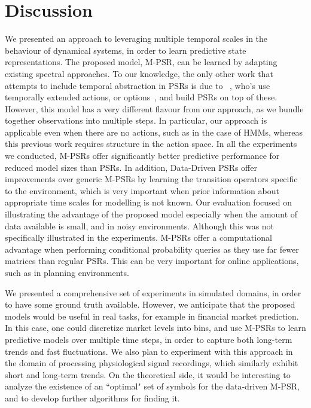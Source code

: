 \section{Discussion}

We presented an approach to leveraging multiple temporal scales in the behaviour of dynamical systems, in order to learn predictive state representations.  The proposed model, M-PSR, can be learned by adapting existing spectral approaches.  To our knowledge, the only other work that attempts to include temporal abstraction in PSRs is due to ~\cite{wolfe06}, who's use temporally extended actions, or options~\cite{sutton99}, and build PSRs on top of these.  However, this model has a very different flavour from our approach, as we bundle together observations into multiple steps.  In particular, our approach is applicable even when there are no actions, such as in the case of HMMs, whereas this previous work requires structure in the action space.
In all the experiments we conducted, M-PSRs offer significantly better predictive performance for reduced model sizes than PSRs. In addition, Data-Driven PSRs offer improvements over generic M-PSRs by learning the transition operators specific to the environment, which is very important when prior information about appropriate time scales for modelling is not known.  Our evaluation focused on illustrating the advantage of the proposed model especially when the amount of data available is small, and in noisy environments.
 Although this was not specifically illustrated in the experiments. M-PSRs offer a computational advantage when performing conditional probability queries as they use far fewer matrices than regular PSRs. This can be very important for online applications, such as in planning environments. 
 
 We presented a comprehensive set of experiments in simulated domains, in order to have some ground truth available.  However, we anticipate that the proposed models would be useful in real tasks, for example in financial market prediction.  In this case, one could discretize market levels into bins, and use M-PSRs to learn predictive models over multiple time steps, in order to capture both long-term trends and fast fluctuations.  We also plan to experiment with this approach in the domain of processing physiological signal recordings, which similarly exhibit short and long-term trends.  On the theoretical side, it would be interesting to analyze the existence of an ``optimal" set of symbols for the data-driven M-PSR, and to develop further algorithms for finding it.


